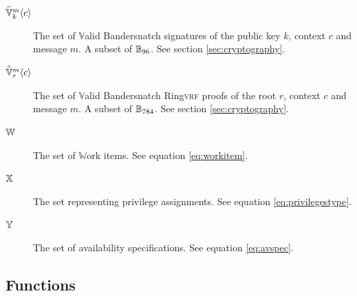 \begin{description}
  \item[$\bssignature{k}{c}{m}$] The set of $\mathbb{V}$alid Bandersnatch signatures of the public key $k$, context $c$ and message $m$. A subset of $\blob[96]$. See section \ref{sec:cryptography}.
  \item[$\bsringproof{r}{c}{m}$] The set of $\mathbb{V}$alid Bandersnatch Ring\textsc{vrf} proofs of the root $r$, context $c$ and message $m$. A subset of $\blob[784]$. See section \ref{sec:cryptography}.
  \item[$\workitem$] The set of $\mathbb{W}$ork items. See equation \ref{eq:workitem}.
  \item[$\privilegestype$] The set representing privilege assignments. See equation \ref{eq:privilegestype}.
  \item[$\avspec$] The set of availability specifications. See equation \ref{eq:avspec}.
\end{description}

\subsection{Functions}

